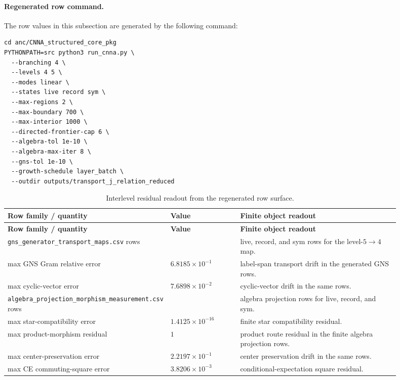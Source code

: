 \documentclass[11pt]{article}
\theoremstyle{remark}
\newcommand{\code}[1]{\texttt{#1}}
\numberwithin{equation}{section}
\begin{document}
\paragraph{Regenerated row command.}
The row values in this subsection are generated by the following command:
\begin{verbatim}
cd anc/CNNA_structured_core_pkg
PYTHONPATH=src python3 run_cnna.py \
  --branching 4 \
  --levels 4 5 \
  --modes linear \
  --states live record sym \
  --max-regions 2 \
  --max-boundary 700 \
  --max-interior 1000 \
  --directed-frontier-cap 6 \
  --algebra-tol 1e-10 \
  --algebra-max-iter 8 \
  --gns-tol 1e-10 \
  --growth-schedule layer_batch \
  --outdir outputs/transport_j_relation_reduced
\end{verbatim}

\begin{longtable}{>{\raggedright\arraybackslash}p{0.30\linewidth}>{\raggedleft\arraybackslash}p{0.18\linewidth}>{\raggedright\arraybackslash}p{0.42\linewidth}}
\caption{Interlevel residual readout from the regenerated row surface.}\label{tab:interlevel-residual-readout}\\
\toprule
\textbf{Row family / quantity} & \textbf{Value} & \textbf{Finite object readout}\\
\midrule
\endfirsthead
\toprule
\textbf{Row family / quantity} & \textbf{Value} & \textbf{Finite object readout}\\
\midrule
\endhead
\code{gns\_generator\_transport\_maps.csv} rows & 3 & live, record, and sym rows for the level-$5\to4$ map.\\
\hline
max GNS Gram relative error & $6.8185\times10^{-1}$ & label-span transport drift in the generated GNS rows.\\
\hline
max cyclic-vector error & $7.6898\times10^{-2}$ & cyclic-vector drift in the same rows.\\
\hline
\code{algebra\_\allowbreak{}projection\_\allowbreak{}morphism\_\allowbreak{}measurement.csv} rows & 3 & algebra projection rows for live, record, and sym.\\
\hline
max star-compatibility error & $1.4125\times10^{-16}$ & finite star compatibility residual.\\
\hline
max product-morphism residual & $1$ & product route residual in the finite algebra projection rows.\\
\hline
max center-preservation error & $2.2197\times10^{-1}$ & center preservation drift in the same rows.\\
\hline
max CE commuting-square error & $3.8206\times10^{-3}$ & conditional-expectation square residual.\\

\end{longtable}
\end{document}
